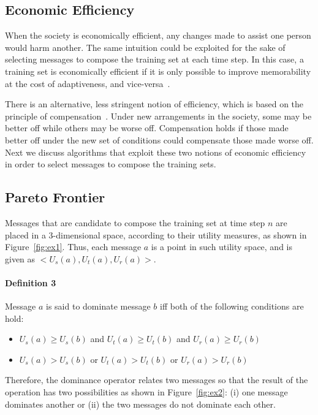 \documentclass{sig-alternate}
\begin{document}
\subsection{Economic Efficiency}

When the society is economically efficient, any changes made to assist one person would harm another. The same intuition could be exploited for the sake of selecting messages to compose the training set at each time step. In this case, a training set is economically efficient if it is only possible to improve memorability at the cost of adaptiveness, and vice-versa~\cite{recsys12,icmr14}.

There is an alternative, less stringent notion of efficiency, which is based on the principle of compensation~\cite{compensation}.
Under new arrangements in the society, some may be better off while others may be worse off.
Compensation holds if those made better off
under the new set of conditions could compensate those made worse off. Next we discuss algorithms that exploit these two notions of economic efficiency in order to select messages to compose the training sets.

\subsection*{Pareto Frontier}
Messages that are candidate to compose the training set at time step $n$ are placed in a 3-dimensional space, according to their utility measures, as shown in Figure~\ref{fig:ex1}.
Thus, each message $a$ is a point in such utility space, and is given as $<U_s(a),U_t(a),U_r(a)>$.

\paragraph*{\bf{Definition 3}} Message $a$ is said to dominate message $b$ iff both of the following conditions are hold:
\begin{itemize}
\item $U_s(a)\ge U_s(b)$ and $U_t(a)\ge U_t(b)$ and $U_r(a)\ge U_r(b)$
\item $U_s(a) > U_s(b)$ or $U_t(a) > U_t(b)$ or $U_r(a) > U_r(b)$
\end{itemize}
Therefore, the dominance operator relates two messages so that the result of the
operation has two possibilities as shown in Figure~\ref{fig:ex2}: (i) one message dominates another or (ii) the two
messages do not dominate each other.
\end{document}
